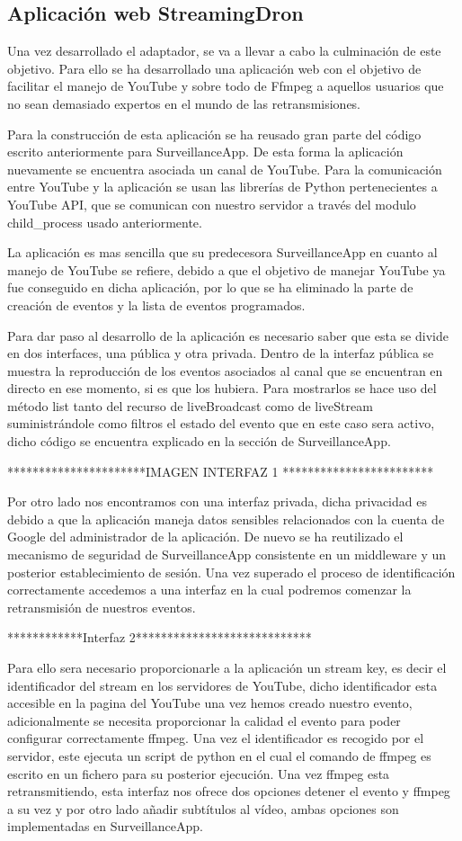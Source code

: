 \subsection{Aplicación web StreamingDron}

Una vez desarrollado el adaptador, se va a llevar a cabo la culminación de este objetivo. Para ello se ha desarrollado una aplicación web con el objetivo de facilitar el manejo de YouTube y sobre todo de Ffmpeg a aquellos usuarios que no sean demasiado expertos en el mundo de las retransmisiones.

Para la construcción de esta aplicación se ha reusado gran parte del código escrito anteriormente para SurveillanceApp. De esta forma la aplicación nuevamente se encuentra asociada un canal de YouTube. Para la comunicación entre YouTube y la aplicación se usan las librerías de Python pertenecientes a YouTube API, que se comunican con nuestro servidor a través del modulo child\_process usado anteriormente.

La aplicación es mas sencilla que su predecesora SurveillanceApp en cuanto al manejo de YouTube se refiere, debido a que el objetivo de manejar YouTube ya fue conseguido en dicha aplicación, por lo que se ha eliminado la parte de creación de eventos y la lista de eventos programados.

Para dar paso al desarrollo de la aplicación es necesario saber que esta se divide en dos interfaces, una pública y otra privada. Dentro de la interfaz pública se muestra la reproducción de los eventos asociados al canal que se encuentran en directo en ese momento, si es que los hubiera. Para mostrarlos se hace uso del método list tanto del recurso de liveBroadcast como de liveStream suministrándole como filtros el estado del evento que en este caso sera activo, dicho código se encuentra explicado en la sección de SurveillanceApp.

**********************IMAGEN INTERFAZ 1 ************************

Por otro lado nos encontramos con una interfaz privada, dicha privacidad es debido a que la aplicación maneja datos sensibles relacionados con la cuenta de Google del administrador de la aplicación. De nuevo se ha reutilizado el mecanismo de seguridad de SurveillanceApp consistente en un middleware y un posterior establecimiento de sesión. Una vez superado el proceso de identificación correctamente accedemos a una interfaz en la cual podremos comenzar la retransmisión de nuestros eventos.

************Interfaz 2****************************

Para ello sera necesario proporcionarle a la aplicación un stream key, es decir el identificador del stream en los servidores de YouTube, dicho identificador esta accesible en la pagina del YouTube una vez hemos creado nuestro evento, adicionalmente se necesita proporcionar la calidad el evento para poder configurar correctamente ffmpeg. Una vez el identificador es recogido por el servidor, este ejecuta un script de python en el cual el comando de ffmpeg es escrito en un fichero para su posterior ejecución. Una vez ffmpeg esta retransmitiendo, esta interfaz nos ofrece dos opciones detener el evento y ffmpeg a su vez y por otro lado añadir subtítulos al vídeo, ambas opciones son implementadas en SurveillanceApp. 